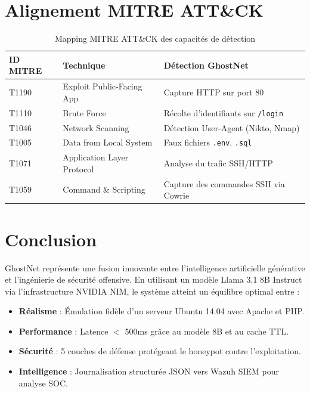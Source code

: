 \documentclass[12pt,a4paper]{article}
\begin{document}
\section{Alignement MITRE ATT\&CK}

\begin{table}[h!]
\centering
\small
\begin{tabularx}{\textwidth}{l l X}
\toprule
\textbf{ID MITRE} & \textbf{Technique} & \textbf{Détection GhostNet} \\
\midrule
T1190 & Exploit Public-Facing App & Capture HTTP sur port 80 \\
T1110 & Brute Force & Récolte d'identifiants sur \texttt{/login} \\
T1046 & Network Scanning & Détection User-Agent (Nikto, Nmap) \\
T1005 & Data from Local System & Faux fichiers \texttt{.env}, \texttt{.sql} \\
T1071 & Application Layer Protocol & Analyse du trafic SSH/HTTP \\
T1059 & Command \& Scripting & Capture des commandes SSH via Cowrie \\
\bottomrule
\end{tabularx}
\caption{Mapping MITRE ATT\&CK des capacités de détection}
\end{table}

\section{Conclusion}

GhostNet représente une fusion innovante entre l'intelligence artificielle générative et l'ingénierie de sécurité offensive. En utilisant un modèle Llama 3.1 8B Instruct via l'infrastructure NVIDIA NIM, le système atteint un équilibre optimal entre :

\begin{itemize}[noitemsep]
    \item \textbf{Réalisme} : Émulation fidèle d'un serveur Ubuntu 14.04 avec Apache et PHP.
    \item \textbf{Performance} : Latence $<$ 500ms grâce au modèle 8B et au cache TTL.
    \item \textbf{Sécurité} : 5 couches de défense protégeant le honeypot contre l'exploitation.
    \item \textbf{Intelligence} : Journalisation structurée JSON vers Wazuh SIEM pour analyse SOC.
\end{itemize}
\end{document}
